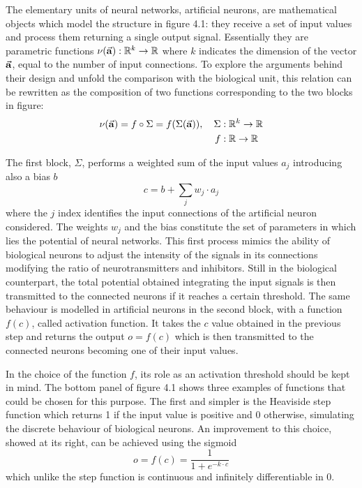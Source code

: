 \documentclass[a4paper,10pt]{report}
\begin{document}
The elementary units of neural networks, artificial neurons, are mathematical objects
which model the structure in figure 4.1: they receive a set of input values
and process them returning a single output signal.
Essentially they are parametric functions $\nu(\va a): \mathbb R ^k \rightarrow \mathbb R$ 
where $k$ indicates the dimension of the vector $\va a$, equal to the number of input connections.
To explore the arguments behind their design and unfold the
comparison with the biological unit, this relation can be rewritten 
as the composition of two functions corresponding to the two blocks in figure:
\begin{align}
    \nu (\va a) = f \circ \Sigma = f(\Sigma (\va a)), \hspace{10pt}
    \Sigma &: \mathbb R^k \rightarrow \mathbb R \\
    f &: \mathbb R \rightarrow \mathbb R \nonumber
\end{align}

The first block, $\Sigma$, performs a weighted sum of the input values $a_{j}$ introducing also a bias $b$
\begin{equation}
   c = b + \sum_j w_{j} \cdot a_{j} 
\end{equation}
where the $j$ index identifies the input connections of the artificial neuron considered.
The weights $w_{j}$ and the bias constitute the set of parameters in which
lies the potential of neural networks.
This first process mimics the ability of biological neurons to adjust the intensity of the signals in its connections
modifying the ratio of neurotransmitters and inhibitors.
Still in the biological counterpart, the total potential obtained integrating the input signals is then transmitted to the 
connected neurons if it reaches a certain threshold.
The same behaviour is modelled in artificial neurons in the second block, 
with a function $f(c)$, called activation function. It takes the $c$ value obtained in the
previous step and returns the output $o = f(c)$ which is then transmitted to the connected neurons 
becoming one of their input values.

In the choice of the function $f$, its role as an activation threshold should be kept in mind.
The bottom panel of figure 4.1 shows three examples of functions that could be chosen for this purpose.
The first and simpler is the Heaviside step function which
returns 1 if the input value is positive and 0 otherwise, simulating the discrete behaviour of 
biological neurons.
An improvement to this choice, showed at its right, can be achieved using the sigmoid
\begin{equation}
    o = f(c) = \frac{1}{1+e^{-k\cdot c}}
\end{equation}
which unlike the step function is continuous and infinitely differentiable in 0.
\end{document}
